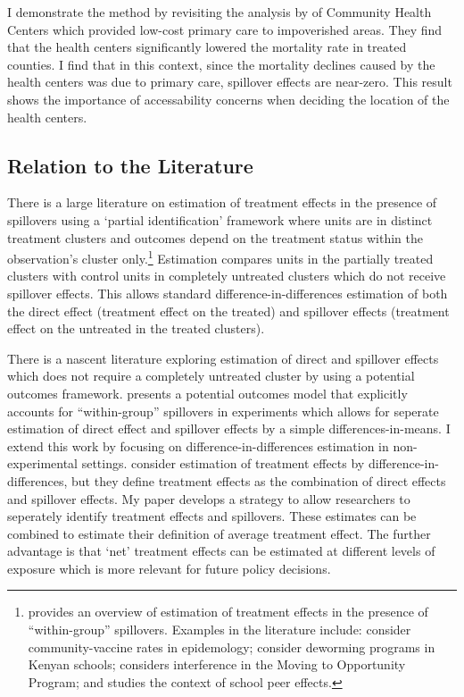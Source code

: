 \documentclass[11pt]{article}
\begin{document}
I demonstrate the method by revisiting the analysis by \citet{Bailey_Goodman_Bacon_2015} of Community Health Centers which provided low-cost primary care to impoverished areas. They find that the health centers significantly lowered the mortality rate in treated counties. I find that in this context, since the mortality declines caused by the health centers was due to primary care, spillover effects are near-zero. This result shows the importance of accessability concerns when deciding the location of the health centers.

\subsection{Relation to the Literature} 

There is a large literature on estimation of treatment effects in the presence of spillovers using a `partial identification' framework where units are in distinct treatment clusters and outcomes depend on the treatment status within the observation's cluster only.\footnote{ \citet{Angelucci_DiMaro_2016} provides an overview of estimation of treatment effects in the presence of ``within-group'' spillovers. Examples in the literature include: \citet{Halloran_Struchiner_1995} consider community-vaccine rates in epidemology; \citet{Miguel_Kremer_2004} consider deworming programs in Kenyan schools; \citet{Sobel_2006} considers interference in the Moving to Opportunity Program; and \citet{Angrist_2014} studies the context of school peer effects.} Estimation compares units in the partially treated clusters with control units in completely untreated clusters which do not receive spillover effects. This allows standard difference-in-differences estimation of both the direct effect (treatment effect on the treated) and spillover effects (treatment effect on the untreated in the treated clusters). 

There is a nascent literature exploring estimation of direct and spillover effects which does not require a completely untreated cluster by using a potential outcomes framework. \citet{Vazquez-Bare_2019} presents a potential outcomes model that explicitly accounts for ``within-group'' spillovers in experiments which allows for seperate estimation of direct effect and spillover effects by a simple differences-in-means. I extend this work by focusing on difference-in-differences estimation in non-experimental settings.  \citet{Savje_Aronow_Hudgens_2019} consider estimation of treatment effects by difference-in-differences, but they define treatment effects as the combination of direct effects and spillover effects. My paper develops a strategy to allow researchers to seperately identify treatment effects and spillovers. These estimates can be combined to estimate their definition of average treatment effect. The further advantage is that `net' treatment effects can be estimated at different levels of exposure which is more relevant for future policy decisions.
\end{document}
